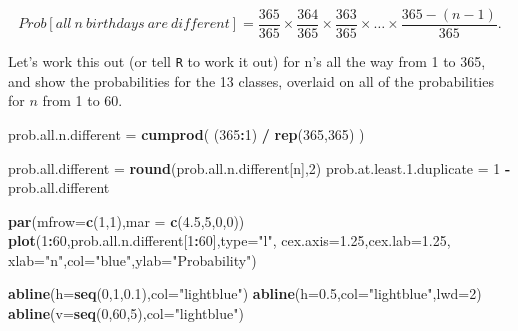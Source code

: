 \documentclass[]{book}
\newenvironment{Shaded}{\begin{snugshade}}{\end{snugshade}}
\newcommand{\DataTypeTok}[1]{\textcolor[rgb]{0.13,0.29,0.53}{#1}}
\newcommand{\DecValTok}[1]{\textcolor[rgb]{0.00,0.00,0.81}{#1}}
\newcommand{\FloatTok}[1]{\textcolor[rgb]{0.00,0.00,0.81}{#1}}
\newcommand{\KeywordTok}[1]{\textcolor[rgb]{0.13,0.29,0.53}{\textbf{#1}}}
\newcommand{\NormalTok}[1]{#1}
\newcommand{\OperatorTok}[1]{\textcolor[rgb]{0.81,0.36,0.00}{\textbf{#1}}}
\newcommand{\StringTok}[1]{\textcolor[rgb]{0.31,0.60,0.02}{#1}}
\begin{document}
\[Prob[all \ n \ birthdays \ are \ different] = \frac{365}{365} \times \frac{364}{365} \times \frac{363}{365} \times \dots \times \frac{365-(n-1)}{365}.\]

Let's work this out (or tell \texttt{R} to work it out) for n's all the way from 1 to 365, and show the probabilities for the 13 classes, overlaid on all of the probabilities for \(n\) from 1 to 60.

\begin{Shaded}
\begin{Highlighting}[]
\NormalTok{prob.all.n.different =}\StringTok{ }\KeywordTok{cumprod}\NormalTok{( (}\DecValTok{365}\OperatorTok{:}\DecValTok{1}\NormalTok{) }\OperatorTok{/}\StringTok{ }\KeywordTok{rep}\NormalTok{(}\DecValTok{365}\NormalTok{,}\DecValTok{365}\NormalTok{) )}

\NormalTok{prob.all.different =}\StringTok{ }\KeywordTok{round}\NormalTok{(prob.all.n.different[n],}\DecValTok{2}\NormalTok{)}
\NormalTok{prob.at.least.}\FloatTok{1.}\NormalTok{duplicate =}\StringTok{ }\DecValTok{1} \OperatorTok{-}\StringTok{ }\NormalTok{prob.all.different}

\KeywordTok{par}\NormalTok{(}\DataTypeTok{mfrow=}\KeywordTok{c}\NormalTok{(}\DecValTok{1}\NormalTok{,}\DecValTok{1}\NormalTok{),}\DataTypeTok{mar =} \KeywordTok{c}\NormalTok{(}\FloatTok{4.5}\NormalTok{,}\DecValTok{5}\NormalTok{,}\DecValTok{0}\NormalTok{,}\DecValTok{0}\NormalTok{))}
\KeywordTok{plot}\NormalTok{(}\DecValTok{1}\OperatorTok{:}\DecValTok{60}\NormalTok{,prob.all.n.different[}\DecValTok{1}\OperatorTok{:}\DecValTok{60}\NormalTok{],}\DataTypeTok{type=}\StringTok{"l"}\NormalTok{,}
     \DataTypeTok{cex.axis=}\FloatTok{1.25}\NormalTok{,}\DataTypeTok{cex.lab=}\FloatTok{1.25}\NormalTok{,}
     \DataTypeTok{xlab=}\StringTok{"n"}\NormalTok{,}\DataTypeTok{col=}\StringTok{"blue"}\NormalTok{,}\DataTypeTok{ylab=}\StringTok{"Probability"}\NormalTok{)}

\KeywordTok{abline}\NormalTok{(}\DataTypeTok{h=}\KeywordTok{seq}\NormalTok{(}\DecValTok{0}\NormalTok{,}\DecValTok{1}\NormalTok{,}\FloatTok{0.1}\NormalTok{),}\DataTypeTok{col=}\StringTok{"lightblue"}\NormalTok{)}
\KeywordTok{abline}\NormalTok{(}\DataTypeTok{h=}\FloatTok{0.5}\NormalTok{,}\DataTypeTok{col=}\StringTok{"lightblue"}\NormalTok{,}\DataTypeTok{lwd=}\DecValTok{2}\NormalTok{)}
\KeywordTok{abline}\NormalTok{(}\DataTypeTok{v=}\KeywordTok{seq}\NormalTok{(}\DecValTok{0}\NormalTok{,}\DecValTok{60}\NormalTok{,}\DecValTok{5}\NormalTok{),}\DataTypeTok{col=}\StringTok{"lightblue"}\NormalTok{)}


\end{Highlighting}
\end{Shaded}
\end{document}
